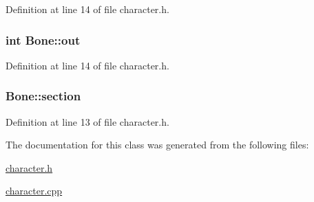 Definition at line 14 of file character.\-h.

\hypertarget{class_bone_a50dfae7fc1869eee97ef2eeb2602ccd7}{
\subsubsection[{out}]{\setlength{\rightskip}{0pt plus 5cm}int Bone\-::out}}\label{class_bone_a50dfae7fc1869eee97ef2eeb2602ccd7}


Definition at line 14 of file character.\-h.

\hypertarget{class_bone_a8e2c06c41d28182e494317a9e027f273}{
\subsubsection[{section}]{ Bone\-::section}}\label{class_bone_a8e2c06c41d28182e494317a9e027f273}


Definition at line 13 of file character.\-h.



The documentation for this class was generated from the following files\-:\begin{DoxyCompactItemize}
\item 
\hyperlink{character_8h}{character.\-h}\item 
\hyperlink{character_8cpp}{character.\-cpp}\end{DoxyCompactItemize}
